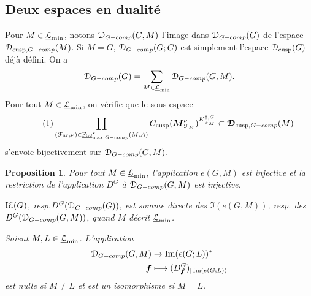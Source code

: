 \documentclass[11pt]{article}
\newcommand{\resp}{resp.\xspace}
\newcommand{\skpt}{\smallskip}
\numberwithin{equation}{section}\providecommand{\og}{«\,}\providecommand{\fg}{\,»}
\let\mathcal \EuScript
\let\oldenumerate\enumerate
\renewcommand{\enumerate}{\oldenumerate\itemindent0pt}
\newenvironment{enumeratei}
{\bgroup\def\theenumi{\roman{enumi}}\def\theenumii{\arabic{enumii}}\oldenumerate}
{\endenumerate\egroup}
\newcommand\mto{\mathchoice{\longmapsto}{\mapsto}{\mapsto}{\mapsto}}
\newcommand{\tcomp}{\textup{-comp}}
\newcommand{\cusp}{\mathrm{cusp}}
\newcommand{\Fac}{\mathrm{Fac}}
\DeclareMathOperator{\rIE}{I\cE}
\newcommand{\bmf}{\boldsymbol{f}}
\newcommand{\bM}{\boldsymbol{M}}
\newcommand{\cD}{\mathcal{D}}
\newcommand{\cE}{\mathcal{E}}
\newcommand{\cF}{\mathcal{F}}
\newcommand{\cL}{\mathcal{L}}
\theoremstyle{plain}
\newtheorem*{prop*}{Proposition}
\theoremstyle{definition}
\begin{document}
\subsection{Deux espaces en dualité}\label{deuxespaces}

Pour $M\in \underline{\cL}_{\min}$, notons $\cD_{G\tcomp}(G,M)$ l'image dans $\cD_{G\tcomp}(G)$ de
l'espace $\cD_{\cusp,G\tcomp}(M)$. Si $M=G$, $\cD_{G\tcomp}(G;G)$ est simplement l'espace $\cD_{\cusp}(G)$ déjà défini. On a
\[
\cD_{G\tcomp}(G)=\sum_{M\in \underline{\cL}_{\min}}\cD_{G\tcomp}(G,M).
\]
Pour tout $M\in \underline{\cL}_{\min}$,
on vérifie que le sous-espace
\begin{equation}\tag{1}\label{deuxespaces1}
\prod_{(\cF_{M},\nu)\in \underline{\Fac}^*_{\max,G\tcomp}(M,A)}C_{\cusp}(\bM^{\nu}_{\cF_{M}})^{K_{\cF_{M}}^{\dag,G}}\subset \boldsymbol{\cD}_{\cusp,G\tcomp}(M)
\end{equation}
s'envoie bijectivement sur $\cD_{G\tcomp}(G,M)$.

\skpt
\begin{prop*}
\begin{enumeratei}
\item\label{deuxespacesi}
Pour tout $M\in \underline{\cL}_{\min}$, l'application $e(G,M)$ est injective et la restriction de l'application $D^G$ à $\cD_{G\tcomp}(G,M)$ est injective.

\item\label{deuxespacesii}
$\rIE(G)$, \resp $D^G(\cD_{G\tcomp}(G))$, est somme directe des $\Im(e(G,M))$, \resp des $D^G(\cD_{G\tcomp}(G,M))$, quand $M$ décrit $\underline{\cL}_{\min}$.

\item\label{deuxespacesiii}
Soient $M,L\in \underline{\cL}_{\min}$. L'application
\begin{align*}
\cD_{G\tcomp}(G,M)&\to \Im(e(G;L))^*\\
\bmf&\mto (D^G_{\bmf})_{\vert \Im(e(G;L))}
\end{align*}
est nulle si $M\neq L$ et est un isomorphisme si $M=L$.
\end{enumeratei}
\end{prop*}
\end{document}
